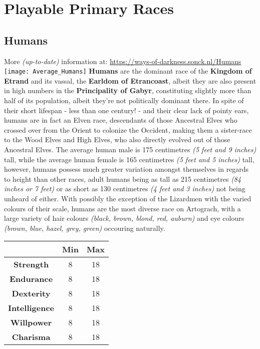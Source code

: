 \documentclass[openany,10pt,a4paper]{book}
\begin{document}
\chapter{Playable Primary Races}
\section{Humans}
More \textit{(up-to-date)} information at: \url{https://ways-of-darkness.sonck.nl/Humans}\newline
\texttt{[image: Average\_Humans]}\newline
\textbf{Humans} are the dominant race of the \textbf{Kingdom of Etrand} and its vassal, the \textbf{Earldom of Etrancoast}, albeit they are also present in high numbers in the \textbf{Principality of Gabyr}, constituting slightly more than half of its population, albeit they're not politically dominant there. In spite of their short lifespan - less than one century! - and their clear lack of pointy ears, humans are in fact an Elven race, descendants of those Ancestral Elves who crossed over from the Orient to colonize the Occident, making them a sister-race to the Wood Elves and High Elves, who also directly evolved out of those Ancestral Elves.\newline
The average human male is 175 centimetres \textit{(5 feet and 9 inches)} tall, while the average human female is 165 centimetres \textit{(5 feet and 5 inches)} tall, however, humans possess much greater variation amongst themselves in regards to height than other races, adult humans being as tall as 215 centimetres \textit{(84 inches or 7 feet)} or as short as 130 centimetres \textit{(4 feet and 3 inches)} not being unheard of either. With possibly the exception of the Lizardmen with the varied colours of their scale, humans are the most diverse race on Artograch, with a large variety of hair colours \textit{(black, brown, blond, red, auburn)} and eye colours \textit{(brown, blue, hazel, grey, green)} occouring naturally.\newline
\begin{tabular}{|c|c|c|}
\hline
 & \textbf{Min} & \textbf{Max} \\ \hline
\textbf{Strength} & 8 & 18 \\ \hline
\textbf{Endurance} & 8 & 18 \\ \hline
\textbf{Dexterity} & 8 & 18 \\ \hline
\textbf{Intelligence} & 8 & 18 \\ \hline
\textbf{Willpower} & 8 & 18 \\ \hline
\textbf{Charisma} & 8 & 18 \\ \hline
\end{tabular}\newline
{} \newpage
\end{document}
